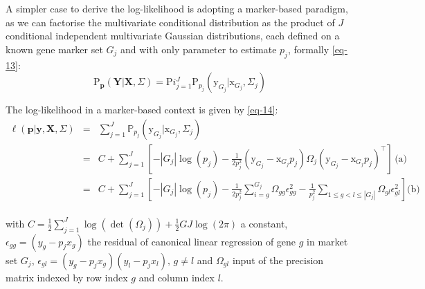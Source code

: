 \documentclass[pdflatex, sn-nature]{sn-jnl}
\theoremstyle{thmstyleone}%
\theoremstyle{thmstyletwo}%
\theoremstyle{thmstylethree}%
\begin{document}
\begin{appendices}
        A simpler case to derive the log-likelihood is adopting a marker-based
        paradigm, as we can factorise the multivariate conditional distribution as
        the product of $J$ conditional independent multivariate Gaussian distributions,
        each defined on a known gene marker set $G_{j}$ and with only parameter
        to estimate $p_{j}$, formally \ref{eq-13}:
        \begin{equation}
            \label{eq-13}\mathrm{P}_{\boldsymbol{p}}(\boldsymbol{Y}|\boldsymbol{X}
            , \Sigma) = \mathrm{P}i_{j=1}^{J} \mathrm{P}_{p_j}(\mathrm{y}_{G_j}|\mathrm{x}
            _{G_j}, \Sigma_{j})
        \end{equation}

        The log-likelihood in a marker-based context is given by \ref{eq-14}:
        \begin{equation}
            \label{eq-14}
            \begin{array}{lcl}
                \ell(\boldsymbol{p}|\boldsymbol{y}, \boldsymbol{X}, \Sigma) & = & \sum_{j=1}^J \mathbb{P}_{p_j}(\mathrm{y}_{ G_j}|\mathrm{x}_{G_j}, \Sigma_j)                                                                                                                                 \\
                                                                            & = & C + \sum_{j=1}^J \left[ - |G_j| \log(p_j) - \frac{1}{2p_{j}^{2}} (\mathrm{y}_{ G_j}- \mathrm{x}_{G_j} p_j) \Omega_{j} (\mathrm{y}_{ G_j} - \mathrm{x}_{G_j} p_j)^\top \right] \, \text{(a)}                 \\
                                                                            & = & C + \sum_{j=1}^J \left[ - |G_j| \log(p_j) - \frac{1}{2p_{j}^{2}} \sum_{i=g}^{G_j} \Omega_{gg}\epsilon_{gg}^2 - \frac{1}{p_{j}^{2}} \sum_{1\le g <l \le |G_j|} \Omega_{gl} \epsilon_{gl}^2\right] \text{(b)} \\
            \end{array}
        \end{equation}

        with $C= \frac{1}{2}\sum_{j=1}^{J} \log(\det(\Omega_{j})) + \frac{1}{2}GJ
        \log(2\pi)$ a constant, $\epsilon_{gg}=(y_{g} - p_{j}x_{g})$ the
        residual of canonical linear regression of gene $g$ in market set
        $G_{j}$, $\epsilon_{gl}=(y_{g} - p_{j}x_{g})(y_{l} - p_{j}x_{l}), \, g \neq
        l$ and $\Omega_{gl}$ input of the precision matrix indexed by row index $g$
        and column index $l$.


\end{appendices}
\end{document}
